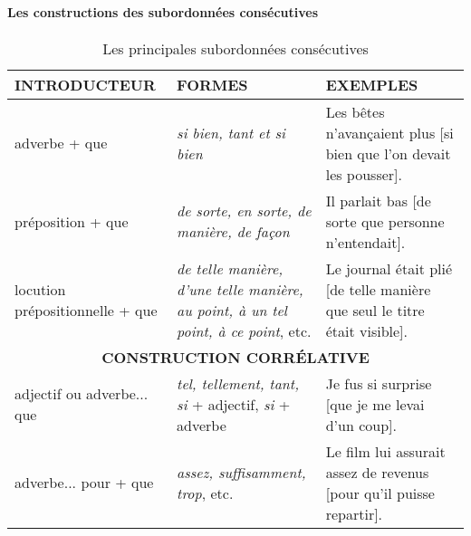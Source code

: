 \documentclass[UTF8]{report}
\begin{document}
\paragraph{Les constructions des subordonnées consécutives}
\begin{table}[H]
    \centering
    \small
    \begin{adjustbox}{max width=\textwidth}
        \begin{tabular}{|p{4cm}|p{6cm}|p{6cm}|}
        \hline
        \rowcolor{cyan!20}
        \textbf{INTRODUCTEUR} & \textbf{FORMES} & \textbf{EXEMPLES} \\
        \hline
        adverbe + que & \textit{si bien, tant et si bien} & Les bêtes n'avançaient plus [si bien que l'on devait les pousser]. \\
        \hline
        préposition + que & \textit{de sorte, en sorte, de manière, de façon} & Il parlait bas [de sorte que personne n'entendait]. \\
        \hline
        locution prépositionnelle + que & \textit{de telle manière, d'une telle manière, au point, à un tel point, à ce point}, etc. & Le journal était plié [de telle manière que seul le titre était visible]. \\
        \hline
        \multicolumn{3}{|c|}{\textbf{CONSTRUCTION CORRÉLATIVE}} \\
        \hline
        adjectif ou adverbe... que & \textit{tel, tellement, tant, si} + adjectif, \textit{si} + adverbe & Je fus si surprise [que je me levai d'un coup]. \\
        \hline
        adverbe... pour + que & \textit{assez, suffisamment, trop}, etc. & Le film lui assurait assez de revenus [pour qu'il puisse repartir]. \\
        \hline
        \end{tabular}
    \end{adjustbox}
    \caption{Les principales subordonnées consécutives}
\end{table}
\end{document}

